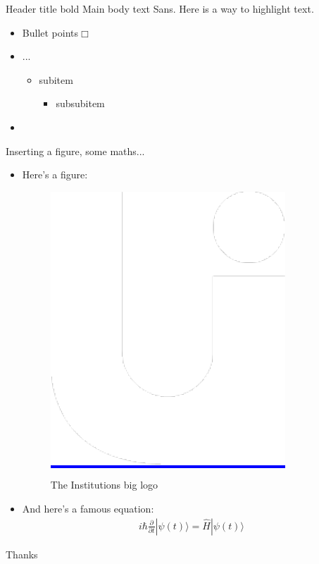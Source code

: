 \documentclass{beamer}
\begin{document}
\begin{frame}[t]{Header title bold}
	Main body text Sans. Here is a way to \alert{highlight text}.
	\label{sec:Test1}
	\begin{itemize}
		\item Bullet points$\Box$
		\item ...
			\begin{itemize}
				\item subitem
					\begin{itemize}
						\item subsubitem
					\end{itemize}
			\end{itemize}
		\item \lipsum[2]
	\end{itemize}
\end{frame}


\begin{frame}{Inserting a figure, some maths...}
  \begin{itemize}
  \item   Here's a figure:
    \begin{figure}[h]
      \centering
      \colorbox{blue}{\includegraphics[width=.13\linewidth]{./assets/img/logo}}
      \caption{The Institutions big logo}
      \label{fig:big-u}
    \end{figure}
  \item 
    And here's a famous equation:
  \begin{eqnarray}
    \label{eq:schroedinger}
    i\hbar {\frac {\partial }{\partial t}}|\psi (t)\rangle ={\hat {H}}|\psi (t)\rangle
  \end{eqnarray}
  \end{itemize}
\end{frame}



\begin{frame}
	\begin{center}
		{\fontsize{50}{60}\selectfont Thanks}
	\end{center}
\end{frame}
\end{document}
